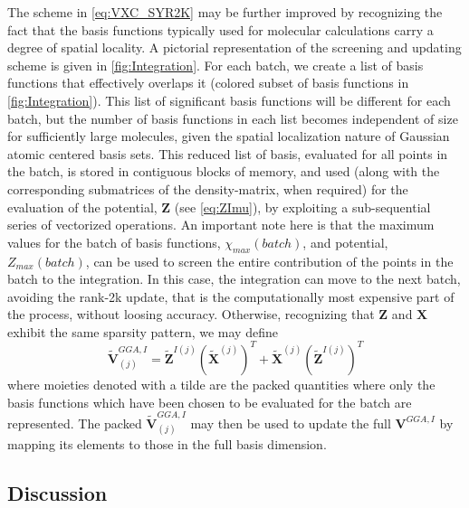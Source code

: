 The scheme in \cref{eq:VXC_SYR2K} may be further improved by recognizing the fact  that the basis functions typically used for molecular calculations carry 
a degree of spatial locality. 
A pictorial representation of the screening and updating scheme is given in \cref{fig:Integration}.
For each batch, we create a list of basis functions
that effectively overlaps it (colored subset of basis functions in \cref{fig:Integration}). 
This list of significant basis functions will be different for
each batch, but the number of basis
functions in each list becomes independent of size
for sufficiently large molecules, given the  spatial localization nature of Gaussian atomic centered basis sets.
This reduced list of basis, evaluated for all points in the batch, is stored in contiguous blocks of memory, and used (along with the corresponding submatrices of the density-matrix, when required) for the evaluation of the potential, $\mathbf{Z}$ (see \cref{eq:ZImu}), by exploiting a sub-sequential series of vectorized operations.
An important note here is that the maximum values for the batch of basis functions, $\chi_{max}(batch)$, and potential, $Z_{max}(batch)$, can be used to screen the entire contribution of the points in the batch to the integration. In this case, the integration can move to the next batch, avoiding the rank-2k update, that is the computationally most expensive part of the process,  without loosing accuracy.
Otherwise, recognizing that $\mathbf{Z}$ and $\mathbf{X}$ exhibit the same sparsity pattern, we may define
\begin{equation}
\tilde{\mathbf{V}}_{(j)}^{GGA,I} = \tilde{\mathbf{Z}}^{I(j)} \left(\tilde{\mathbf{X}}^{(j)}\right)^T + 
\tilde{\mathbf{X}}^{(j)} \left(\tilde{\mathbf{Z}}^{I(j)}\right)^T
\end{equation}
where moieties denoted with a tilde are the packed quantities where only the basis functions which have been chosen to be evaluated for the batch are represented.
The packed $\tilde{\mathbf{V}}_{(j)}^{GGA,I}$ may then be used to update the full $\mathbf{V}^{GGA,I}$ by mapping its elements to those in the full basis dimension.

\subsection{Discussion}


